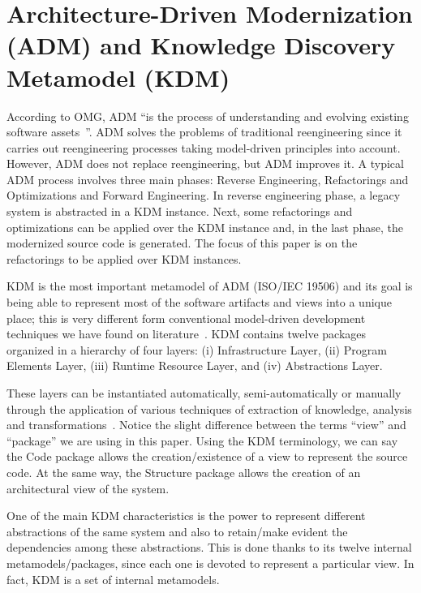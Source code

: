 
\section{Architecture-Driven Modernization (ADM) and Knowledge Discovery Metamodel (KDM)} %
\label{sec:background}

According to OMG, ADM ``is the process of understanding and evolving existing software assets~\cite{1686216}''. ADM solves the problems of traditional reengineering since it carries out reengineering processes taking model-driven principles into account. However, ADM does not replace reengineering, but ADM improves it. A typical ADM process involves three main phases: Reverse Engineering, Refactorings and Optimizations and Forward Engineering.  In reverse engineering phase, a legacy system is abstracted in a KDM instance. Next, some refactorings and optimizations can be applied over the KDM instance and, in the last phase, the modernized source code is generated. The focus of this paper is on the refactorings to be applied over KDM instances.  

KDM is the most important metamodel of ADM (ISO/IEC 19506) and its goal is being able to represent most of the software artifacts and views into a unique place; this is very different form conventional model-driven development techniques we have found on literature~\cite{7051941, Perez-Castillo:2011:KDM}. KDM contains twelve packages organized in a hierarchy of four layers: (i) Infrastructure Layer, (ii) Program Elements Layer, (iii) Runtime Resource Layer, and (iv) Abstractions Layer.

These layers can be instantiated automatically, semi-automatically or manually through the application of various techniques of extraction of knowledge, analysis and transformations~\cite{OMGADM}. Notice the slight difference between the terms ``view'' and ``package'' we are using in this paper. Using the KDM terminology, we can say the Code package allows the creation/existence of a view to represent the source code. At the same way, the Structure package allows the creation of an architectural view of the system. 

One of the main KDM characteristics is the power to represent different abstractions of the same system and also to retain/make evident the dependencies among these abstractions. This is done thanks to its twelve internal metamodels/packages, since each one is devoted to represent a particular view. In fact, KDM is a set of internal metamodels. 

